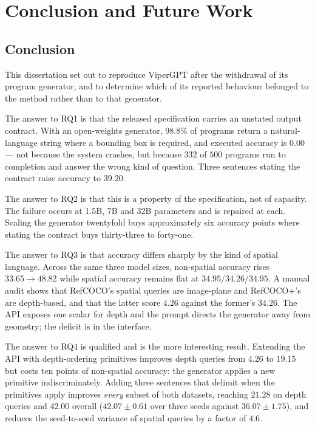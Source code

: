 \documentclass[12pt,a4paper,oneside]{report}
\begin{document}
\chapter{Conclusion and Future Work}
\label{ch:conclusion}

\section{Conclusion}

This dissertation set out to reproduce ViperGPT after the withdrawal of its program
generator, and to determine which of its reported behaviour belonged to the method rather
than to that generator.

The answer to RQ1 is that the released specification carries an unstated output contract.
With an open-weights generator, $98.8\%$ of programs return a natural-language string
where a bounding box is required, and executed accuracy is $0.00$ --- not because the
system crashes, but because $332$ of $500$ programs run to completion and answer the wrong
kind of question. Three sentences stating the contract raise accuracy to $39.20$.

The answer to RQ2 is that this is a property of the specification, not of capacity. The
failure occurs at 1.5B, 7B and 32B parameters and is repaired at each. Scaling the
generator twentyfold buys approximately six accuracy points where stating the contract
buys thirty-three to forty-one.

The answer to RQ3 is that accuracy differs sharply by the kind of spatial language. Across
the same three model sizes, non-spatial accuracy rises $33.65 \to 48.82$ while spatial
accuracy remains flat at $34.95 / 34.26 / 34.95$. A manual audit shows that RefCOCO's
spatial queries are image-plane and RefCOCO+'s are depth-based, and that the latter score
$4.26$ against the former's $34.26$. The API exposes one scalar for depth and the prompt
directs the generator away from geometry; the deficit is in the interface.

The answer to RQ4 is qualified and is the more interesting result. Extending the API with
depth-ordering primitives improves depth queries from $4.26$ to $19.15$ but costs ten
points of non-spatial accuracy: the generator applies a new primitive indiscriminately.
Adding three sentences that delimit when the primitives apply improves \emph{every} subset
of both datasets, reaching $21.28$ on depth queries and $42.00$ overall
($42.07 \pm 0.61$ over three seeds against $36.07 \pm 1.75$), and reduces the seed-to-seed
variance of spatial queries by a factor of $4.6$.
\end{document}
